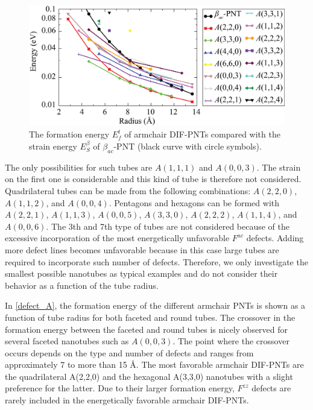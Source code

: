 \begin{figure}[htb]
\centering
\includegraphics[width=0.9\linewidth]{Nanotu_AE.eps}%
\caption{The formation energy $E_f^t$ of armchair DIF-PNTs compared with the strain energy $E_S^{\beta}$ of $\beta_{ac}$-PNT (black curve with circle symbols). \label{defect_A}}
\end{figure}

The only possibilities for such tubes are $A(1,1,1)$ and $A(0,0,3)$. The strain on the first one is considerable and this kind of tube is therefore not considered. Quadrilateral tubes can be made from the following combinations: $A(2,2,0)$, $A(1,1,2)$, and $A(0,0,4)$. Pentagons and hexagons can be formed with $A(2,2,1)$, $A(1,1,3)$, $A(0,0,5)$, $A(3,3,0)$, $A(2,2,2)$, $A(1,1,4)$, and $A(0,0,6)$. The 3th and 7th type of tubes are not considered because of the excessive incorporation of the most energetically unfavorable $F^{ac}$ defects. Adding more defect lines becomes unfavorable because in this case large tubes are required to incorporate such number of defects. Therefore, we only investigate the smallest possible nanotubes as typical examples and do not consider their behavior as a function of the tube radius.

In \autoref{defect_A}, the formation energy of the different armchair PNTs is shown as a function of tube radius for both faceted and round tubes. The crossover in the formation energy between the faceted and round tubes is nicely observed for several faceted nanotubes such as $A(0,0,3)$. The point where the crossover occurs depends on the type and number of defects and ranges from approximately 7 to more than 15 {\AA}. The most favorable armchair DIF-PNTs are the quadrilateral A(2,2,0) and the hexagonal A(3,3,0) nanotubes with a slight preference for the latter. Due to their larger formation energy, $F^{zz}$ defects are rarely included in the energetically favorable armchair DIF-PNTs.\\

